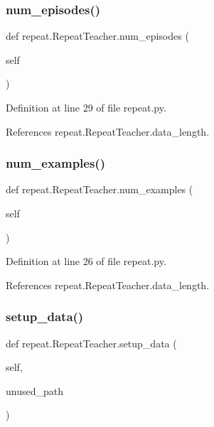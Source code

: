 \subsubsection{\texorpdfstring{num\+\_\+episodes()}{num\_episodes()}}
{\footnotesize\ttfamily def repeat.\+Repeat\+Teacher.\+num\+\_\+episodes (\begin{DoxyParamCaption}\item[{}]{self }\end{DoxyParamCaption})}



Definition at line 29 of file repeat.\+py.



References repeat.\+Repeat\+Teacher.\+data\+\_\+length.

\mbox{\label{classrepeat_1_1RepeatTeacher_a81ce5597db3285a2580204cc11643a46}} 
\subsubsection{\texorpdfstring{num\+\_\+examples()}{num\_examples()}}
{\footnotesize\ttfamily def repeat.\+Repeat\+Teacher.\+num\+\_\+examples (\begin{DoxyParamCaption}\item[{}]{self }\end{DoxyParamCaption})}



Definition at line 26 of file repeat.\+py.



References repeat.\+Repeat\+Teacher.\+data\+\_\+length.

\mbox{\label{classrepeat_1_1RepeatTeacher_a8e4298b0c8ff674b8b4c3c2f73d0e71d}} 
\subsubsection{\texorpdfstring{setup\+\_\+data()}{setup\_data()}}
{\footnotesize\ttfamily def repeat.\+Repeat\+Teacher.\+setup\+\_\+data (\begin{DoxyParamCaption}\item[{}]{self,  }\item[{}]{unused\+\_\+path }\end{DoxyParamCaption})}



